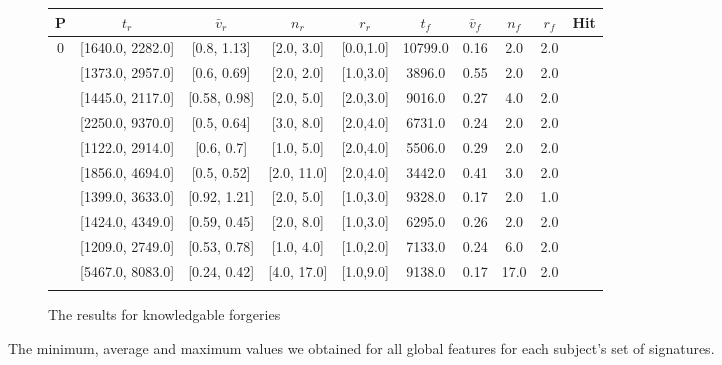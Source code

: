 \documentclass[a4paper, oneside]{csthesis}
\newcommand{\xmark}{\ding{55}}%
\begin{document}
\begin{figure}
    \begin{subfigure}[b]{\textwidth}
            \centering
            \tabcolsep 4pt
            \small
            \begin{tabular}{c|cccc||cccc||c}
            \hline
            \textbf{P} & $t_r$ & $\bar{v}_r$ & $n_r$ & $r_r$ & $t_f$ & $\bar{v}_f$ & $n_f$ & $r_f$ & Hit \\
            \hline
            0 & [1640.0, 2282.0] & [0.8, 1.13] & [2.0, 3.0] & [0.0,1.0] & 10799.0 & 0.16 & 2.0 & 2.0 & \xmark \\ \hdashline[0.5pt/3pt]
            1 & [1373.0, 2957.0] & [0.6, 0.69] & [2.0, 2.0] & [1.0,3.0] & 3896.0 & 0.55 & 2.0 & 2.0 & \xmark \\ \hdashline[0.5pt/3pt]
            2 & [1445.0, 2117.0] & [0.58, 0.98] & [2.0, 5.0] & [2.0,3.0] & 9016.0 & 0.27 & 4.0 & 2.0 & \xmark \\ \hdashline[0.5pt/3pt]
            3 & [2250.0, 9370.0] & [0.5, 0.64] & [3.0, 8.0] & [2.0,4.0] & 6731.0 & 0.24 & 2.0 & 2.0 & \xmark \\ \hdashline[0.5pt/3pt]
            4 & [1122.0, 2914.0] & [0.6, 0.7] & [1.0, 5.0] & [2.0,4.0] & 5506.0 & 0.29 & 2.0 & 2.0 & \xmark \\ \hdashline[0.5pt/3pt]
            5 & [1856.0, 4694.0] & [0.5, 0.52] & [2.0, 11.0] & [2.0,4.0] & 3442.0 & 0.41 & 3.0 & 2.0 & \xmark \\ \hdashline[0.5pt/3pt]
            6 & [1399.0, 3633.0] & [0.92, 1.21] & [2.0, 5.0] & [1.0,3.0] & 9328.0 & 0.17 & 2.0 & 1.0 & \xmark \\ \hdashline[0.5pt/3pt]
            7 & [1424.0, 4349.0] & [0.59, 0.45] & [2.0, 8.0] & [1.0,3.0] & 6295.0 & 0.26 & 2.0 & 2.0 & \xmark \\ \hdashline[0.5pt/3pt]
            8 & [1209.0, 2749.0] & [0.53, 0.78] & [1.0, 4.0] & [1.0,2.0] & 7133.0 & 0.24 & 6.0 & 2.0 & \xmark \\ \hdashline[0.5pt/3pt]
            9 & [5467.0, 8083.0] & [0.24, 0.42] & [4.0, 17.0] & [1.0,9.0] & 9138.0 & 0.17 & 17.0 & 2.0 & \xmark \\ \hdashline[0.5pt/3pt]
            \hline
            \end{tabular}
            \label{tbl:global-features-forg-knowledgable}
            \caption{The results for knowledgable forgeries}
    \end{subfigure}%


    \caption{The minimum, average and maximum values we obtained for all global features for each subject's set of signatures.}
    \label{fig:global-features-forgeries}
\end{figure}
\end{document}
